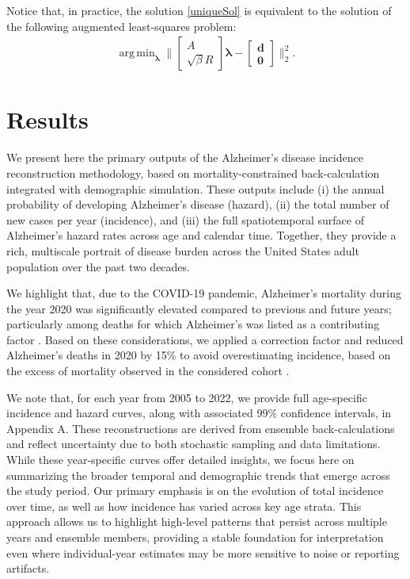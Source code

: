 \documentclass{article}
\DeclareMathOperator*{\argmin}{arg\,min}
\def\blambda{\boldsymbol{\lambda}}
\def\bd{\boldsymbol{d}}
\begin{document}
Notice that, in practice, the solution \eqref{uniqueSol} is equivalent to the solution of the following augmented least-squares problem:
\begin{align}\label{augLS}
    \argmin_{\blambda} \bigg\| \begin{bmatrix} A \\ \sqrt{\beta} R \end{bmatrix} \blambda - \begin{bmatrix}
        \bd \\ \boldsymbol{0}
    \end{bmatrix} \bigg\|_2^2.
\end{align}


\section{Results}
\label{sec:results}

We present here the primary outputs of the Alzheimer’s disease incidence reconstruction methodology, based on mortality-constrained back-calculation integrated with demographic simulation. These outputs include (i) the annual probability of developing Alzheimer’s disease (hazard), (ii) the total number of new cases per year (incidence), and (iii) the full spatiotemporal surface of Alzheimer’s hazard rates across age and calendar time. Together, they provide a rich, multiscale portrait of disease burden across the United States adult population over the past two decades. 

We highlight that, due to the COVID-19 pandemic, Alzheimer's mortality during the year 2020 was significantly elevated compared to previous and future years; particularly among deaths for which Alzheimer's was listed as a contributing factor \cite{alzheimer2025,cdc_wonder}. Based on these considerations, we applied a correction factor and reduced Alzheimer's deaths in 2020 by 15\% to avoid overestimating incidence, based on the excess of mortality observed in the considered cohort \cite{alzheimer2025}.  

We note that, for each year from 2005 to 2022, we provide full age-specific incidence and hazard curves, along with associated 99\% confidence intervals, in Appendix A. These reconstructions are derived from ensemble back-calculations and reflect uncertainty due to both stochastic sampling and data limitations. While these year-specific curves offer detailed insights, we focus here on summarizing the broader temporal and demographic trends that emerge across the study period. Our primary emphasis is on the evolution of total incidence over time, as well as how incidence has varied across key age strata. This approach allows us to highlight high-level patterns that persist across multiple years and ensemble members, providing a stable foundation for interpretation even where individual-year estimates may be more sensitive to noise or reporting artifacts.
\end{document}
